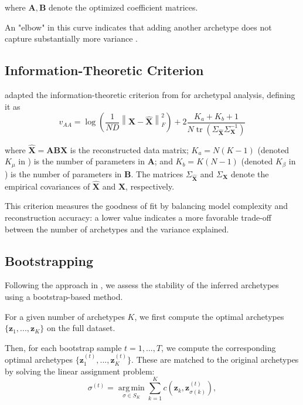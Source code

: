 \documentclass[oneside]{article}
\DeclareMathOperator*{\argmin}{arg\,min}
\begin{document}
where $\mathbf{A}, \mathbf{B}$ denote the optimized coefficient matrices.

An "elbow" in this curve indicates that adding another archetype does not capture substantially more variance \autocite{cutlerArchetypalAnalysis1994,morupArchetypalAnalysisMachine2012, eugsterSpiderManHeroArchetypal2009}.

\subsection{Information-Theoretic Criterion}

\textcite{sulemanValidationArchetypalAnalysis2017} adapted the information-theoretic criterion from \textcite{sulemanMeasuringCongruenceFuzzy2017} for archetypal analysis, defining it as
\begin{equation}
    v_{AA} =
    \log \left( \frac{1}{N D} \left\| \mathbf{X} - \hat{\mathbf{X}} \right\|_F^2 \right)
    + 2 \frac{K_a + K_b + 1}{N \operatorname{tr}\left( \Sigma_{\hat{\mathbf{X}}} \Sigma_{\mathbf{X}}^{-1}\right)}
\end{equation}

where $\hat{\mathbf{X}} = \mathbf{A} \mathbf{B} \mathbf{X}$ is the reconstructed data matrix; $K_{a} = N (K-1)$ (denoted $K_\mu$ in \autocite{sulemanValidationArchetypalAnalysis2017}) is the number of parameters in $\mathbf{A}$; and $K_{b} = K (N-1)$ (denoted $K_\beta$ in \autocite{sulemanValidationArchetypalAnalysis2017}) is the number of parameters in $\mathbf{B}$. The matrices $\Sigma_{\hat{\mathbf{X}}}$ and $\Sigma_{\mathbf{X}}$ denote the empirical covariances of $\hat{\mathbf{X}}$ and $\mathbf{X}$, respectively.

This criterion measures the goodness of fit by balancing model complexity and reconstruction accuracy: a lower value indicates a more favorable trade-off between the number of archetypes and the variance explained.

\subsection{Bootstrapping}

Following the approach in \autocite{Hart2015, Korem2015}, we assess the stability of the inferred archetypes using a bootstrap-based method.

For a given number of archetypes $K$, we first compute the optimal archetypes $\{ \mathbf{z}_1, ..., \mathbf{z}_K \}$ on the full dataset.

Then, for each bootstrap sample $t = 1, ..., T$, we compute the corresponding optimal archetypes $\{ \mathbf{z}_1^{(t)}, ..., \mathbf{z}_K^{(t)} \}$. These are matched to the original archetypes by solving the linear assignment problem:
\begin{equation}
    \sigma^{(t)} = \underset{\sigma \in S_K}{\argmin} \sum_{k=1}^K c\left( \mathbf{z}_k, \mathbf{z}_{\sigma(k)}^{(t)} \right),
\end{equation}
\end{document}
